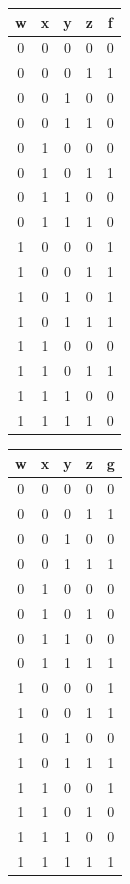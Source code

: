 \documentclass{article}
\begin{document}
    \begin{center}
        \begin{tabular} {cccc|c}
            w & x & y & z & f \\
            \hline
            0 & 0 & 0 & 0 & 0 \\
            0 & 0 & 0 & 1 & 1 \\
            0 & 0 & 1 & 0 & 0 \\
            0 & 0 & 1 & 1 & 0 \\
            0 & 1 & 0 & 0 & 0 \\
            0 & 1 & 0 & 1 & 1 \\
            0 & 1 & 1 & 0 & 0 \\
            0 & 1 & 1 & 1 & 0 \\
            1 & 0 & 0 & 0 & 1 \\
            1 & 0 & 0 & 1 & 1 \\
            1 & 0 & 1 & 0 & 1 \\
            1 & 0 & 1 & 1 & 1 \\
            1 & 1 & 0 & 0 & 0 \\
            1 & 1 & 0 & 1 & 1 \\
            1 & 1 & 1 & 0 & 0 \\
            1 & 1 & 1 & 1 & 0 \\
        \end{tabular}
        \quad\quad\quad
        \begin{tabular} {cccc|c}
            w & x & y & z & g \\
            \hline
            0 & 0 & 0 & 0 & 0 \\
            0 & 0 & 0 & 1 & 1 \\
            0 & 0 & 1 & 0 & 0 \\
            0 & 0 & 1 & 1 & 1 \\
            0 & 1 & 0 & 0 & 0 \\
            0 & 1 & 0 & 1 & 0 \\
            0 & 1 & 1 & 0 & 0 \\
            0 & 1 & 1 & 1 & 1 \\
            1 & 0 & 0 & 0 & 1 \\
            1 & 0 & 0 & 1 & 1 \\
            1 & 0 & 1 & 0 & 0 \\
            1 & 0 & 1 & 1 & 1 \\
            1 & 1 & 0 & 0 & 1 \\
            1 & 1 & 0 & 1 & 0 \\
            1 & 1 & 1 & 0 & 0 \\
            1 & 1 & 1 & 1 & 1 \\
        \end{tabular}
    \end{center}
\end{document}
